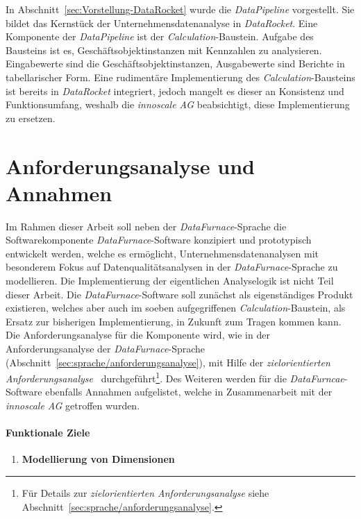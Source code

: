 \documentclass[
  language=german, %
  type=bachelor,%
  ngerman
]{isthesis}
\begin{document}
\begin{content}
  In Abschnitt~\ref{sec:Vorstellung-DataRocket} wurde die \textit{DataPipeline}
  vorgestellt. Sie bildet das Kernstück der Unternehmensdatenanalyse in
  \textit{DataRocket}. Eine Komponente der \textit{DataPipeline} ist der
  \textit{Calculation}-Baustein.  Aufgabe des Bausteins ist es,
  Geschäftsobjektinstanzen mit Kennzahlen zu analysieren. Eingabewerte sind die
  Geschäftsobjektinstanzen, Ausgabewerte sind Berichte in tabellarischer Form.
  Eine rudimentäre Implementierung des \textit{Calculation}-Bausteins ist
  bereits in \textit{DataRocket} integriert, jedoch mangelt es dieser an
  Konsistenz und Funktionsumfang, weshalb die \textit{innoscale AG}
  beabsichtigt, diese Implementierung zu ersetzen.

  \section{Anforderungsanalyse und Annahmen}\label{sec:software/anforderungsanalyse}

  Im Rahmen dieser Arbeit soll neben der \textit{DataFurnace}-Sprache die
  Softwarekomponente \textit{DataFurnace}-Software konzipiert und prototypisch
  entwickelt werden, welche es ermöglicht, Unternehmensdatenanalysen mit
  besonderem Fokus auf Datenqualitätsanalysen in der
  \textit{DataFurnace}-Sprache zu modellieren. Die Implementierung der
  eigentlichen Analyselogik ist nicht Teil dieser Arbeit.  Die
  \textit{DataFurnace}-Software soll zunächst als eigenständiges Produkt
  existieren, welches aber auch im soeben aufgegriffenen
  \textit{Calculation}-Baustein, als Ersatz zur bisherigen Implementierung, in
  Zukunft zum Tragen kommen kann. Die Anforderungsanalyse für die
  Komponente wird, wie in der Anforderungsanalyse der
  \textit{DataFurnace}-Sprache
  (Abschnitt~\ref{sec:sprache/anforderungsanalyse}), mit Hilfe der
  \textit{zielorientierten Anforderungsanalyse}~\cite[][]{van2001goal}
  durchgeführt\footnote{Für Details zur \textit{zielorientierten
  Anforderungsanalyse} siehe Abschnitt~\ref{sec:sprache/anforderungsanalyse}.}.
  Des Weiteren werden für die \textit{DataFurncae}-Software ebenfalls Annahmen
  aufgelistet, welche in Zusammenarbeit mit der \textit{innoscale AG} getroffen
  wurden.

  \paragraph{Funktionale Ziele}
  \begin{enumerate}
    \item \textbf{Modellierung von Dimensionen}


\end{enumerate}
\end{content}
\end{document}
